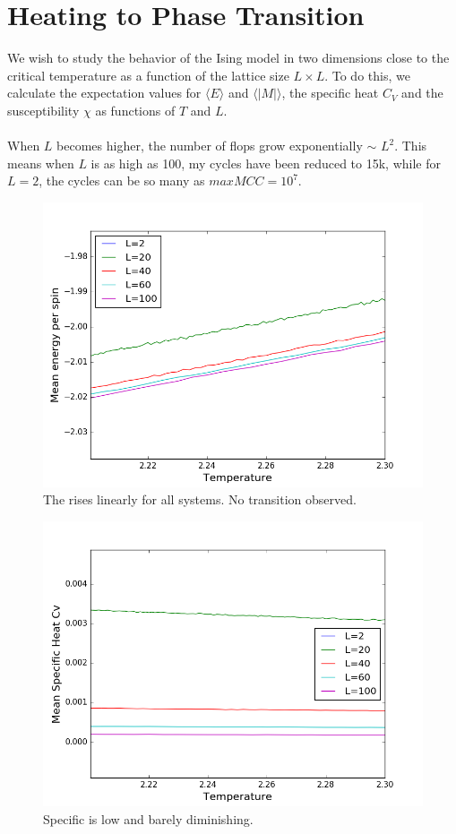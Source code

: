 \documentclass[%
oneside,                 %
final,                   %
10pt]{article}
\begin{document}
\section{Heating to Phase Transition}
We wish to study the behavior of the Ising model
in two dimensions close to the critical temperature as a function of
the lattice size $L\times L$. To do this, we calculate the expectation values for
$\langle E\rangle$ and $\langle \vert M\vert \rangle$, the specific heat
$C_V$ and the susceptibility $\chi$ as functions of $T$ and $L$.
\\
\\
When $L$ becomes higher, the number of flops grow exponentially $\sim$ $L^2$.
This means when $L$ is as high as 100, my cycles have been reduced to 15k,
while for $L=2$, the cycles can be so many as $maxMCC = 10^7$.

\begin{figure}
\includegraphics[scale=0.5]{energy}
\caption{The rises linearly for all systems. No transition observed.}
\label{low}
\end{figure}
\begin{figure}
\includegraphics[scale=0.5]{cv'} 
\caption{Specific is low and barely diminishing.}
\label{high}
\end{figure}
\end{document}
